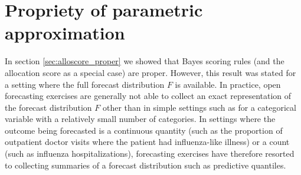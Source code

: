 \documentclass{article}
\begin{document}


\section{Propriety of parametric approximation} %
\label{sec:propriety_of_parametric_approximation}

In section \ref{sec:alloscore_proper} we showed that Bayes scoring rules (and the allocation score as a special case) are proper. However, this result was stated for a setting where the full forecast distribution $F$ is available. In practice, open forecasting exercises are generally not able to collect an exact representation of the forecast distribution $F$ other than in simple settings such as for a categorical variable with a relatively small number of categories. In settings where the outcome being forecasted is a continuous quantity (such as the proportion of outpatient doctor visits where the patient had influenza-like illness) or a count (such as influenza hospitalizations), forecasting exercises have therefore resorted to collecting summaries of a forecast distribution such as predictive quantiles.
\end{document}
